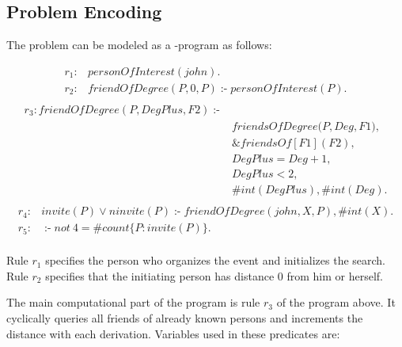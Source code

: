 \documentclass[a4paper, titlepage]{article}
\newcommand{\ext}[3]{\ensuremath{\&{#1}[#2](#3)}}
\DeclareMathOperator{\leftimpl}{:-}
\begin{document}
\subsection{Problem Encoding}
The problem can be modeled as a \hex{}-program as follows:
\begin{exmp}
\label{faceQuery}
\begin{align*}
r_1\colon & \mathit{personOfInterest}(\mathit{john}). \\
r_2\colon & \mathit{friendOfDegree}(\mathit{P, 0, P}) 
\leftimpl  \mathit{personOfInterest}(P).\\
\end{align*}
\begin{align*}
r_{3}\colon \mathit{friendOfDegree}(\mathit{P, DegPlus, 
F2}) \leftimpl & \\  
& \mathit{friendsOfDegree}(\mathit{P,Deg,F1)},\\
& \ext{friendsOf}{F1}{F2},\\ 
& \mathit{DegPlus = Deg + 1}, \\
& \mathit{DegPlus < 2},\\
& \mathit{\#int(DegPlus)}, \mathit{\#int(Deg)}.\\
\end{align*}
\begin{align*}
r_{4}\colon & \mathit{invite(P)} \vee \mathit{ninvite(P) 
\leftimpl  friendOfDegree(john,X,P), \#int(X).}\\
r_{5}\colon & \leftimpl   \mathit{not} \ 4 = \mathit{\#count} 
\{ P : \mathit{invite(P)} \}. \\
\end{align*}
\end{exmp}
Rule $r_1$ specifies the person who organizes the event 
and initializes the search. Rule $r_2$ specifies that the initiating person has 
distance 0 from him or herself. 


The main computational part of the program is rule $r_3$ of 
the program above. It cyclically queries all  friends of 
already known persons and increments the distance with each 
derivation. Variables used in these predicates are: 
\end{document}
